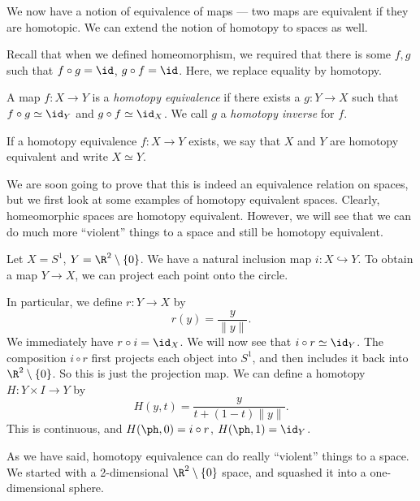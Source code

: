 \documentclass[a4paper]{article}
\begin{document}
We now have a notion of equivalence of maps --- two maps are equivalent if they are homotopic. We can extend the notion of homotopy to spaces as well.

Recall that when we defined homeomorphism, we required that there is some $f, g$ such that $f\circ g = \id$, $g\circ f = \id$. Here, we replace equality by homotopy.
\begin{defi}
  A map $f: X\to Y$ is a \emph{homotopy equivalence} if there exists a $g: Y\to X$ such that $f\circ g \simeq \id_Y$ and $g\circ f \simeq \id_X$. We call $g$ a \emph{homotopy inverse} for $f$.

  If a homotopy equivalence $f: X\to Y$ exists, we say that $X$ and $Y$ are homotopy equivalent and write $X\simeq Y$.
\end{defi}
We are soon going to prove that this is indeed an equivalence relation on spaces, but we first look at some examples of homotopy equivalent spaces. Clearly, homeomorphic spaces are homotopy equivalent. However, we will see that we can do much more ``violent'' things to a space and still be homotopy equivalent.
\begin{eg}
  Let $X = S^1$, $Y = \R^2 \setminus \{0\}$. We have a natural inclusion map $i: X\hookrightarrow Y$. To obtain a map $Y \to X$, we can project each point onto the circle.
  \begin{center}
  \end{center}
  In particular, we define $r: Y\to X$ by
  \[
    r(y) = \frac{y}{\|y\|}.
  \]
  We immediately have $r\circ i = \id_X$. We will now see that $i\circ r \simeq \id_Y$. The composition $i\circ r$ first projects each object into $S^1$, and then includes it back into $\R^2 \setminus \{0\}$. So this is just the projection map. We can define a homotopy $H: Y\times I \to Y$ by
  \[
    H(y, t) = \frac{y}{t + (1 - t)\|y\|}.
  \]
  This is continuous, and $H(\ph, 0) = i\circ r$, $H(\ph, 1) = \id_Y$.
\end{eg}
As we have said, homotopy equivalence can do really ``violent'' things to a space. We started with a 2-dimensional $\R^2\setminus \{0\}$ space, and squashed it into a one-dimensional sphere.
\end{document}

